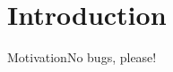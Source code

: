 \documentclass{beamer}
\begin{document}
\section{Introduction}
\begin{frame}{Motivation}{No bugs, please!}
  \begin{center}

\end{center}
\end{frame}
\end{document}
